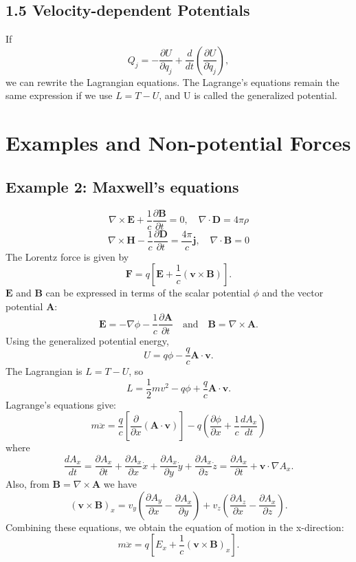\documentclass[12pt,a4paper]{article}
\theoremstyle{definition}
\theoremstyle{remark}
\renewcommand{\vec}[1]{\mathbf{#1}}
\begin{document}
	\subsection{1.5 Velocity-dependent Potentials}
	If
	$$ Q_j = -\frac{\partial U}{\partial q_j} + \frac{d}{dt} \left( \frac{\partial U}{\partial \dot{q}_j} \right), $$
	we can rewrite the Lagrangian equations. The Lagrange's equations remain the same expression if we use $L = T - U$, and U is called the generalized potential.
	
	\section{Examples and Non-potential Forces}
	\subsection{Example 2: Maxwell's equations}
	$$ \nabla \times \vec{E} + \frac{1}{c}\frac{\partial \vec{B}}{\partial t} = 0, \quad \nabla \cdot \vec{D} = 4\pi\rho $$
	$$ \nabla \times \vec{H} - \frac{1}{c}\frac{\partial \vec{D}}{\partial t} = \frac{4\pi}{c}\vec{j}, \quad \nabla \cdot \vec{B} = 0 $$
	The Lorentz force is given by
	$$ \vec{F} = q[\vec{E} + \frac{1}{c}(\vec{v} \times \vec{B})]. $$
	$\vec{E}$ and $\vec{B}$ can be expressed in terms of the scalar potential $\phi$ and the vector potential $\vec{A}$:
	$$ \vec{E} = -\nabla\phi - \frac{1}{c}\frac{\partial \vec{A}}{\partial t} \quad \text{and} \quad \vec{B} = \nabla \times \vec{A}. $$
	Using the generalized potential energy,
	$$ U = q\phi - \frac{q}{c}\vec{A} \cdot \vec{v}. $$
	The Lagrangian is $L=T-U$, so
	$$ L = \frac{1}{2}m v^2 - q\phi + \frac{q}{c}\vec{A} \cdot \vec{v}. $$
	Lagrange's equations give:
	$$ m\ddot{x} = \frac{q}{c}\left[ \frac{\partial}{\partial x}(\vec{A}\cdot\vec{v}) \right] - q\left(\frac{\partial \phi}{\partial x} + \frac{1}{c}\frac{d A_x}{dt}\right) $$
	where
	$$ \frac{dA_x}{dt} = \frac{\partial A_x}{\partial t} + \frac{\partial A_x}{\partial x}\dot{x} + \frac{\partial A_x}{\partial y}\dot{y} + \frac{\partial A_x}{\partial z}\dot{z} = \frac{\partial A_x}{\partial t} + \vec{v} \cdot \nabla A_x. $$
	Also, from $\vec{B} = \nabla \times \vec{A}$ we have
	$$ (\vec{v} \times \vec{B})_x = v_y\left(\frac{\partial A_y}{\partial x} - \frac{\partial A_x}{\partial y}\right) + v_z\left(\frac{\partial A_z}{\partial x} - \frac{\partial A_x}{\partial z}\right). $$
	Combining these equations, we obtain the equation of motion in the x-direction:
	$$ m\ddot{x} = q\left[E_x + \frac{1}{c}(\vec{v} \times \vec{B})_x\right]. $$
	
\end{document}
